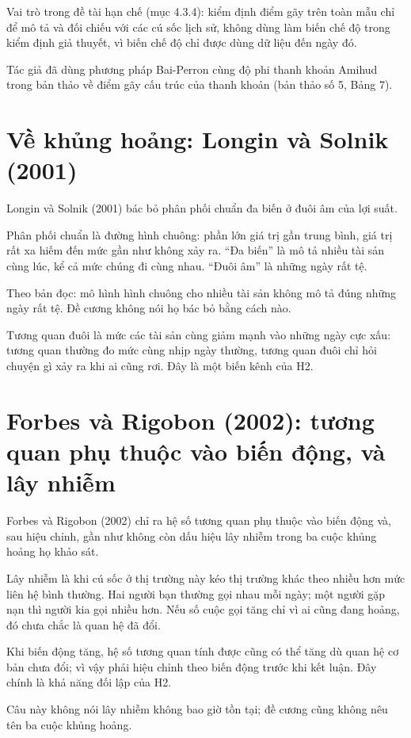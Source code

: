 Vai trò trong đề tài hạn chế (mục 4.3.4): kiểm định điểm gãy trên toàn mẫu chỉ để mô tả và đối chiếu với các cú sốc lịch sử, không dùng làm biến chế độ trong kiểm định giả thuyết, vì biến chế độ chỉ được dùng dữ liệu đến ngày đó.

Tác giả đã dùng phương pháp Bai-Perron cùng độ phi thanh khoản Amihud trong bản thảo về điểm gãy cấu trúc của thanh khoản (bản thảo số 5, Bảng 7).

\section{Về khủng hoảng: Longin và Solnik (2001)}

Longin và Solnik (2001) bác bỏ phân phối chuẩn đa biến ở đuôi âm của lợi suất.

Phân phối chuẩn là đường hình chuông: phần lớn giá trị gần trung bình, giá trị rất xa hiếm đến mức gần như không xảy ra. “Đa biến” là mô tả nhiều tài sản cùng lúc, kể cả mức chúng đi cùng nhau. “Đuôi âm” là những ngày rất tệ.

Theo bản đọc: mô hình hình chuông cho nhiều tài sản không mô tả đúng những ngày rất tệ. Đề cương không nói họ bác bỏ bằng cách nào.

Tương quan đuôi là mức các tài sản cùng giảm mạnh vào những ngày cực xấu: tương quan thường đo mức cùng nhịp ngày thường, tương quan đuôi chỉ hỏi chuyện gì xảy ra khi ai cũng rơi. Đây là một biến kênh của H2.

\section{Forbes và Rigobon (2002): tương quan phụ thuộc vào biến động, và lây nhiễm}

Forbes và Rigobon (2002) chỉ ra hệ số tương quan phụ thuộc vào biến động và, sau hiệu chỉnh, gần như không còn dấu hiệu lây nhiễm trong ba cuộc khủng hoảng họ khảo sát.

Lây nhiễm là khi cú sốc ở thị trường này kéo thị trường khác theo nhiều hơn mức liên hệ bình thường. Hai người bạn thường gọi nhau mỗi ngày; một người gặp nạn thì người kia gọi nhiều hơn. Nếu số cuộc gọi tăng chỉ vì ai cũng đang hoảng, đó chưa chắc là quan hệ đã đổi.

Khi biến động tăng, hệ số tương quan tính được cũng có thể tăng dù quan hệ cơ bản chưa đổi; vì vậy phải hiệu chỉnh theo biến động trước khi kết luận. Đây chính là khả năng đối lập của H2.

Câu này không nói lây nhiễm không bao giờ tồn tại; đề cương cũng không nêu tên ba cuộc khủng hoảng.

